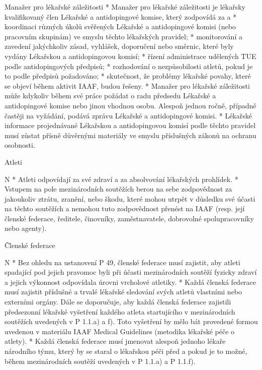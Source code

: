Manažer pro lékařské záležitosti
* Manažer pro lékařské záležitosti je lékařsky kvalifikovaný člen Lékařské a antidopingové komise, který zodpovídá za
  \begitems \style a
  * koordinaci různých úkolů svěřených Lékařské a antidopingové komisi (nebo pracovním skupinám) ve smyslu těchto lékařských pravidel;
  * monitorování a zavedení jakýchkoliv zásad, vyhlášek, doporučení nebo směrnic, které byly vydány Lékařskou a antidopingovou komisí;
  * řízení administrace udělených TUE podle antidopingových předpisů;
  * rozhodování o nezpůsobilosti atletů, pokud je to podle předpisů požadováno;
  * skutečnost, že problémy lékařské povahy, které se objeví během aktivit IAAF, budou řešeny.
  \enditems
* Manažer pro lékařské záležitosti může kdykoliv během své práce požádat o radu předsedu Lékařské a antidopingové komise nebo jinou vhodnou osobu. Alespoň jednou ročně, případně častěji na vyžádání, podává zprávu Lékařské a antidopingové komisi.
* Lékařské informace projednávané Lékařskou a antidopingovou komisí podle těchto pravidel musí zůstat přísně důvěrnými materiály ve smyslu příslušných zákonů na ochranu osobnosti.
\enditems

\secc Atleti

\begitems \style N
* Atleti odpovídají za své zdraví a za absolvování lékařských prohlídek.
* Vstupem na pole mezinárodních soutěžích berou na sebe zodpovědnost za jakoukoliv ztrátu, zranění, nebo škodu, které mohou utrpět v důsledku své účasti na těchto soutěžích a nemohou tuto zodpovědnost přenést na IAAF (resp. její členské federace, ředitele, činovníky, zaměstnavatele, dobrovolné spolupracovníky nebo agenty).
\enditems

\secc Členské federace

\begitems \style N
* Bez ohledu na ustanovení P 49, členské federace musí zajistit, aby atleti spadající pod jejich pravomoc byli při účasti mezinárodních soutěží fyzicky zdraví a jejich výkonnost odpovídala úrovni vrcholové atletiky.
* Každá členská federace musí zajistit příslušné a trvalé lékařské sledování svých atletů vlastními nebo externími orgány. Dále se doporučuje, aby každá členská federace zajistili předsezonní lékařské vyšetření každého atleta startujícího v mezinárodních soutěžích uvedených v P 1.1.a) a f). Toto vyšetření by mělo bát provedené formou uvedenou v materiálu IAAF Medical Guidelines (metodika lékařské péče o atlety).
* Každá členská federace musí jmenovat alespoň jednoho lékaře národního týmu, který by se staral o lékařskou péči před a pokud je to možné, během mezinárodních soutěží uvedených v P 1.1.a) a P 1.1.f).
\enditems

